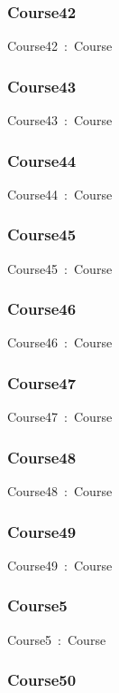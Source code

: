 \documentclass{article}
\begin{document}
\subsubsection*{Course42}

Course42~:~Course

\subsubsection*{Course43}

Course43~:~Course

\subsubsection*{Course44}

Course44~:~Course

\subsubsection*{Course45}

Course45~:~Course

\subsubsection*{Course46}

Course46~:~Course

\subsubsection*{Course47}

Course47~:~Course

\subsubsection*{Course48}

Course48~:~Course

\subsubsection*{Course49}

Course49~:~Course

\subsubsection*{Course5}

Course5~:~Course

\subsubsection*{Course50}
\end{document}
